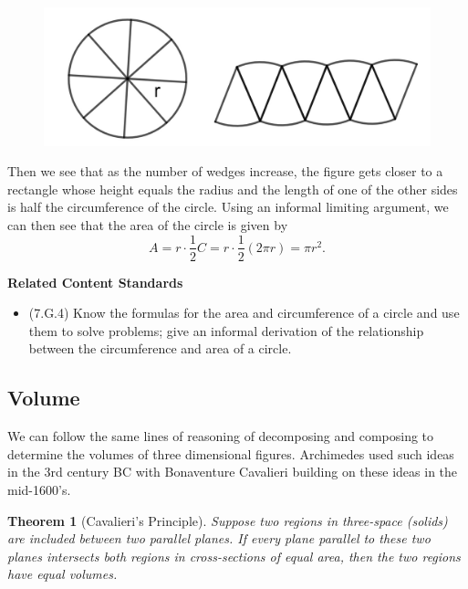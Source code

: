 \documentclass[
]{book}
\providecommand{\tightlist}{%
  \setlength{\itemsep}{0pt}\setlength{\parskip}{0pt}}
\newenvironment{standards}{}{}
\newtheorem{theorem}{Theorem}[chapter]
\theoremstyle{definition}
\theoremstyle{definition}
\theoremstyle{definition}
\theoremstyle{definition}
\theoremstyle{remark}
\begin{document}
\begin{figure}

{\centering \includegraphics[width=0.6\linewidth]{images/Area_circle} 

}

\end{figure}

Then we see that as the number of wedges increase, the figure gets closer to a rectangle whose height equals the radius and the length of one of the other sides is half the circumference of the circle. Using an informal limiting argument, we can then see that the area of the circle is given by
\[A = r \cdot \frac{1}{2} C = r \cdot \frac{1}{2} (2\pi r) = \pi r^2.\]

\begin{standards}

\begin{center}
\textbf{Related Content Standards}

\end{center}

\begin{itemize}
\tightlist
\item
  (7.G.4) Know the formulas for the area and circumference of a circle and use them to solve problems; give an informal derivation of the relationship between the circumference and area of a circle.
\end{itemize}

\end{standards}

\hypertarget{volume}{%
\subsection{Volume}\label{volume}}

We can follow the same lines of reasoning of decomposing and composing to determine the volumes of three dimensional figures. Archimedes used such ideas in the 3rd century BC with Bonaventure Cavalieri building on these ideas in the mid-1600's.

\begin{theorem}[Cavalieri's Principle]
Suppose two regions in three-space (solids) are included between two parallel planes. If every plane parallel to these two planes intersects both regions in cross-sections of equal area, then the two regions have equal volumes.
\end{theorem}
\end{document}
